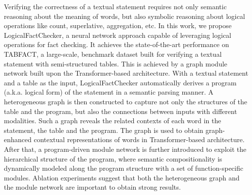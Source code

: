 Verifying the correctness of a textual statement requires not only semantic reasoning about the meaning of words, but also symbolic reasoning about logical operations like count, superlative, aggregation, etc. In this work, we propose LogicalFactChecker, a neural network approach capable of leveraging logical operations for fact checking. It achieves the state-of-the-art performance on TABFACT, a large-scale, benchmark dataset built for verifying a textual statement with semi-structured tables. This is achieved by a graph module network built upon the Transformer-based architecture. With a textual statement and a table as the input, LogicalFactChecker automatically derives a program (a.k.a. logical form) of the statement in a semantic parsing manner. A heterogeneous graph is then constructed to capture not only the structures of the table and the program, but also the connections between inputs with different modalities. Such a graph reveals the related contexts of each word in the statement, the table and the program. The graph is used to obtain graph-enhanced contextual representations of words in Transformer-based architecture. After that, a program-driven module network is further introduced to exploit the hierarchical structure of the program, where semantic compositionality is dynamically modeled along the program structure with a set of function-specific modules. Ablation experiments suggest that both the heterogeneous graph and the module network are important to obtain strong results.
